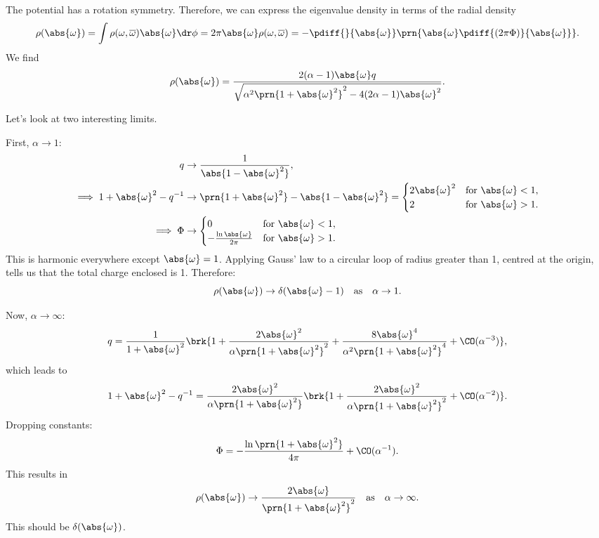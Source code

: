 \documentclass[12pt]{article}
\newcommand{\inv}{^{-1}}
\newcommand{\omb}{\overline{\omega}}
\newcommand{\oa}{\abs{\omega}}
\newcommand{\oas}{\abs{\omega}^2}
\newcommand{\opo}{\prn{1+\abs{\omega}^2}}
\newcommand{\omoa}{\abs{1-\abs{\omega}^2}}
\begin{document}
The potential has a rotation symmetry.
Therefore, we can express the eigenvalue density in terms of the radial density
%
\begin{equation}\label{eq:radialrho}
  \rho(\oa) = \int \rho(\omega,\omb)\oa\dr\phi = 2\pi\oa\rho(\omega,\omb)
   = -\pdiff{}{\oa}\prn{\oa\pdiff{(2\pi\Phi)}{\oa}}.
\end{equation}
%
We find
%
\begin{equation}\label{eq:radialrhosol}
\rho(\oa) =
  \frac{2 (\alpha-1) \oa q}{\sqrt{\alpha^2\opo^2 - 4(2\alpha-1)\oas}}.
\end{equation}
%


Let's look at two interesting limits.

First, $\alpha\to1$:
%
\begin{equation}\label{eq:rszmphiato1}
\begin{aligned}
  q &\to \frac{1}{\omoa},\\
  \implies1+\abs{\omega}^2-q\inv &\to \opo-\omoa =
     \begin{cases}
       2\oas &\text{for } \abs{\omega}<1,\\
       2 &\text{for } \abs{\omega}>1.\\
     \end{cases}\\
  \implies\Phi &\to
     \begin{cases}
       0 &\text{for } \abs{\omega}<1,\\
       -\frac{\ln\abs{\omega}}{2\pi} &\text{for } \abs{\omega}>1.\\
     \end{cases}
\end{aligned}
\end{equation}
%
This is harmonic everywhere except $\abs{\omega}=1$.
Applying Gauss' law to a circular loop of radius greater than 1, centred at the origin, tells us that the total charge enclosed is 1.
Therefore:
%
\begin{equation}\label{eq:rhoato1}
  \rho(\oa) \to \delta(\abs{\omega}-1)
  \quad\text{as}\quad \alpha\to1.
\end{equation}
%


Now, $\alpha\to\infty$:
%
\begin{equation}\label{eq:rsatoinfty}
  q =
  \frac{1}{1+\abs{\omega}^2} \brk{1 + \frac{2\abs{\omega}^ 2}{\alpha\opo^2}
       + \frac{8\abs{\omega}^4}{\alpha^2\opo^4}
       + \CO(\alpha^{-3})},
\end{equation}
%
which leads to
%
\begin{equation}\label{eq:zmatoinfty}
  1+\abs{\omega}^2-q\inv =
  \frac{2\oas}{\alpha\opo} \brk{1 + \frac{2\abs{\omega}^2}{\alpha\opo^2} + \CO(\alpha^{-2})}.
\end{equation}
%
Dropping constants:
%
\begin{equation}\label{eq:phiatoinfty}
  \Phi = -\frac{\ln\opo}{4\pi} + \CO(\alpha^{-1}).
\end{equation}
%
This results in
%
\begin{equation}\label{eq:rhoatoinfty}
  \rho(\oa) \to \frac{2\oa}{\opo^2}
  \quad\text{as}\quad
  \alpha\to\infty.
\end{equation}
%
This should be $\delta(\oa)$.
\end{document}
